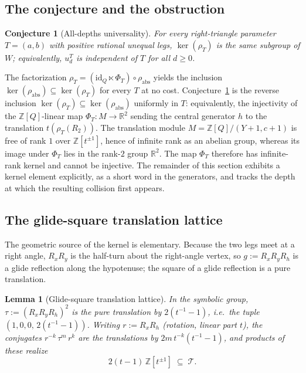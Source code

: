 \documentclass[11pt]{article}
\theoremstyle{plain}
\newtheorem{lemma}[theorem]{Lemma}
\newtheorem{conjecture}[theorem]{Conjecture}
\theoremstyle{definition}
\theoremstyle{remark}
\begin{document}
\subsection{The conjecture and the obstruction}

\begin{conjecture}[All-depths universality]
\label{conj:universality-restate}
For every right-triangle parameter $T = (a,b)$ with positive rational
unequal legs, $\ker(\rho_T)$ is the same subgroup of $W$; equivalently,
$u_d^T$ is independent of $T$ for all $d \ge 0$.
\end{conjecture}

The factorization
$\rho_T = (\mathrm{id}_Q \ltimes \Phi_T) \circ \rho_{\mathrm{abs}}$ yields
the inclusion $\ker(\rho_{\mathrm{abs}}) \subseteq \ker(\rho_T)$ for every
$T$ at no cost. Conjecture~\ref{conj:universality-restate} is the reverse
inclusion $\ker(\rho_T) \subseteq \ker(\rho_{\mathrm{abs}})$ uniformly in
$T$: equivalently, the injectivity of the $\mathbb{Z}[Q]$-linear map
$\Phi_T \colon M \to \mathbb{R}^2$ sending the central generator $h$ to
the translation $t(\rho_T(R_2))$. The translation module
$M = \mathbb{Z}[Q]/(Y+1, c+1)$ is free of rank $1$ over
$\mathbb{Z}[t^{\pm 1}]$, hence of infinite rank as an abelian group,
whereas its image under $\Phi_T$ lies in the rank-$2$ group
$\mathbb{R}^2$. The map $\Phi_T$ therefore has infinite-rank kernel and
cannot be injective. The remainder of this section exhibits a kernel
element explicitly, as a short word in the generators, and tracks the
depth at which the resulting collision first appears.

\subsection{The glide-square translation lattice}

The geometric source of the kernel is elementary. Because the two legs
meet at a right angle, $R_x R_y$ is the half-turn about the right-angle
vertex, so $g := R_x R_y R_h$ is a glide reflection along the
hypotenuse; the square of a glide reflection is a pure translation.

\begin{lemma}[Glide-square translation lattice]
\label{lem:glide-square-restate}
In the symbolic group, $\tau := (R_x R_y R_h)^2$ is the pure translation
by $2(t^{-1}-1)$, i.e.\ the tuple $(1,0,0,\,2(t^{-1}-1))$. Writing
$r := R_x R_h$ (rotation, linear part $t$), the conjugates
$r^{-k}\,\tau^m\,r^{k}$ are the translations by $2m\,t^{-k}(t^{-1}-1)$,
and products of these realize
\[
2(t-1)\,\mathbb{Z}[t^{\pm 1}] \;\subseteq\; \mathcal{T}.
\]
\end{lemma}
\end{document}
